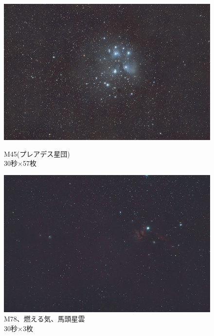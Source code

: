 \begin{figure}[H]
  \centering
  \begin{minipage}{0.48\linewidth}
    \centering
    \includegraphics[width=\linewidth]{sections/Kokubun/pictures/M45.jpg}
    \caption{M45(プレアデス星団)\\
  30秒×57枚}
  \label{M45}
  \end{minipage}
  \begin{minipage}{0.48\linewidth}
    \centering
    \includegraphics[width=\linewidth]{sections/Kokubun/pictures/M78.jpg}
    \caption{M78、燃える気、馬頭星雲\\
  30秒×3枚}
  \label{M4}
  \end{minipage}
\end{figure}





